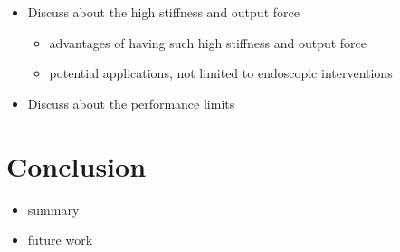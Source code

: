 \documentclass[journal,onecolumn]{IEEEtran}
\begin{document}
\begin{itemize}
\item Discuss about the high stiffness and output force
\begin{itemize}
\item advantages of having such high stiffness and output force
\item potential applications, not limited to endoscopic interventions
\end{itemize}

\item Discuss about the performance limits
\end{itemize}


\section{Conclusion}
\label{sec:org1d4e7bf}
\begin{itemize}
\item summary
\item future work
\end{itemize}




\clearpage
\end{document}
